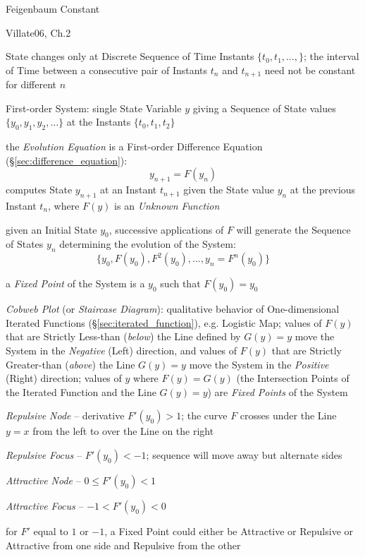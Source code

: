 Feigenbaum Constant

Villate06, Ch.2

State changes only at Discrete Sequence of Time Instants $\{t_0, t_1, \ldots,
\}$; the interval of Time between a consecutive pair of Instants $t_n$ and
$t_{n+1}$ need not be constant for different $n$

First-order System: single State Variable $y$ giving a Sequence of State values
$\{y_0, y_1, y_2, \ldots\}$ at the Instants $\{t_0, t_1, t_2\}$

the \emph{Evolution Equation} is a First-order Difference Equation
(\S\ref{sec:difference_equation}):
\[
  y_{n+1} = F(y_n)
\]
computes State $y_{n+1}$ at an Instant $t_{n+1}$ given the State value $y_n$ at
the previous Instant $t_n$, where $F(y)$ is an \emph{Unknown Function}

given an Initial State $y_0$, successive applications of $F$ will generate the
Sequence of States $y_n$ determining the evolution of the System:
\[
  \{ y_0, F(y_0), F^2(y_0), \ldots, y_n = F^n(y_0) \}
\]

a \emph{Fixed Point} of the System is a $y_0$ such that $F(y_0) = y_0$

\emph{Cobweb Plot} (or \emph{Staircase Diagram}): qualitative behavior of
One-dimensional Iterated Functions (\S\ref{sec:iterated_function}), e.g.
Logistic Map; values of $F(y)$ that are Strictly Less-than (\emph{below}) the
Line defined by $G(y) = y$ move the System in the \emph{Negative} (Left)
direction, and values of $F(y)$ that are Strictly Greater-than (\emph{above})
the Line $G(y) = y$ move the System in the \emph{Positive} (Right) direction;
values of $y$ where $F(y) = G(y)$ (the Intersection Points of the Iterated
Function and the Line $G(y) = y$) are \emph{Fixed Points} of the System

\emph{Repulsive Node} -- derivative $F'(y_0) > 1$; the curve $F$ crosses under
the Line $y=x$ from the left to over the Line on the right

\emph{Repulsive Focus} -- $F'(y_0) < -1$; sequence will move
away but alternate sides

\emph{Attractive Node} -- $0 \leq F'(y_0) < 1$

\emph{Attractive Focus} -- $-1 < F'(y_0) < 0$

for $F'$ equal to $1$ or $-1$, a Fixed Point could either be Attractive or
Repulsive or Attractive from one side and Repulsive from the other

